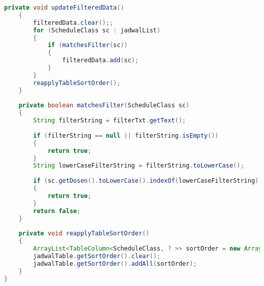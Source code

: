 \begin{lstlisting}[language=Java,basicstyle=\tiny,caption=FXMLDocumentController.java,label=lst:FXMLDocumentController]
    private void updateFilteredData()
    {
        filteredData.clear();;       
        for (ScheduleClass sc : jadwalList)
        {
            if (matchesFilter(sc))
            {
                filteredData.add(sc);
            }
        }       
        reapplyTableSortOrder();
    }
    
    private boolean matchesFilter(ScheduleClass sc)
    {
        String filterString = filterTxt.getText();
        
        if (filterString == null || filterString.isEmpty())
        {
            return true;
        }     
        String lowerCaseFilterString = filterString.toLowerCase();
        
        if (sc.getDosen().toLowerCase().indexOf(lowerCaseFilterString) != -1)
        {
            return true;
        }
        return false;
    }
    
    private void reapplyTableSortOrder()
    {
        ArrayList<TableColumn<ScheduleClass, ? >> sortOrder = new ArrayList<>(jadwalTable.getSortOrder());
        jadwalTable.getSortOrder().clear();
        jadwalTable.getSortOrder().addAll(sortOrder);
    }   
}

\end{lstlisting}

